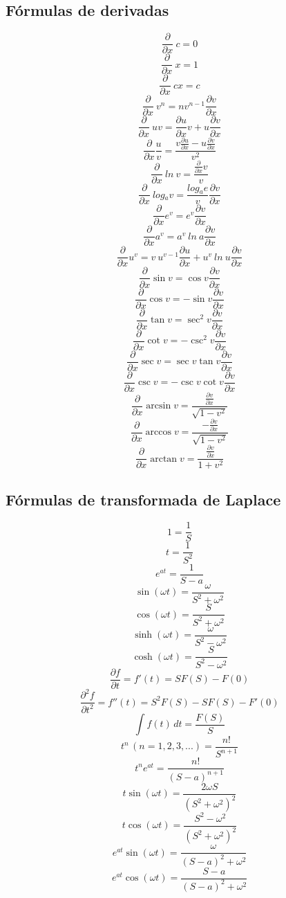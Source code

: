 \documentclass[landscape,twocolumn,letter]{book}
\begin{document}
		\subsection{Fórmulas de derivadas}
		\[ \frac{\partial}{\partial x}\ c = 0 \]
		\[ \frac{\partial}{\partial x}\ x = 1 \]
		\[ \frac{\partial}{\partial x}\ cx = c \]
		\[ \frac{\partial}{\partial x}\ v^n = nv^{n-1} \frac{\partial v}{\partial x} \]
		\[ \frac{\partial}{\partial x}\ uv = \frac{\partial u}{\partial x}v + u\frac{\partial v}{\partial x} \]	
		\[ \frac{\partial}{\partial x} \frac{u}{v} = \frac{v\frac{\partial u}{\partial x}-u\frac{\partial v}{\partial x}}{v^2} \]
		\[ \frac{\partial}{\partial x}\ ln{\ v} = \frac{\frac{\partial}{\partial x}v}{v} \]
		\[ \frac{\partial}{\partial x}\ log{_{a}v} = \frac{log{_{a}e}}{v}\frac{\partial v}{\partial x} \]
		\[ \frac{\partial}{\partial x} e^v = e^v\frac{\partial v}{\partial x} \]
		\[ \frac{\partial}{\partial x} a^v = a^v\ ln{\ a}\frac{\partial v}{\partial x} \]
		\[ \frac{\partial}{\partial x} u^v = v\ u^{v-1}\frac{\partial u}{\partial x} + u^v\ ln{\ u}\frac{\partial v}{\partial x} \]
		\[ \frac{\partial}{\partial x} \sin{v} = \cos{v}\frac{\partial v}{\partial x} \]
		\[ \frac{\partial}{\partial x} \cos{v} = -\sin{v}\frac{\partial v}{\partial x} \]
		\[ \frac{\partial}{\partial x} \tan{v} = \sec^2{v}\frac{\partial v}{\partial x} \]
		\[ \frac{\partial}{\partial x} \cot{v} = -\csc^2{v}\frac{\partial v}{\partial x} \]
		\[ \frac{\partial}{\partial x} \sec{v} = \sec{v}\tan{v}\frac{\partial v}{\partial x} \]
		\[ \frac{\partial}{\partial x} \csc{v} = -\csc{v}\cot{v}\frac{\partial v}{\partial x} \]
		\[ \frac{\partial}{\partial x} \arcsin{v} = \frac{\frac{\partial v}{\partial x}}{\sqrt{1-v^2}} \]
		\[ \frac{\partial}{\partial x} \arccos{v} = \frac{-\frac{\partial v}{\partial x}}{\sqrt{1-v^2}} \]
		\[ \frac{\partial}{\partial x} \arctan{v} = \frac{\frac{\partial v}{\partial x}}{1+v^2} \]
		
		\subsection{Fórmulas de transformada de Laplace}
		\[ 1 = \frac{1}{S} \]
		\[ t = \frac{1}{S^2} \]
		\[ e^{at} = \frac{1}{S-a} \]
		\[ \sin(\omega t) = \frac{\omega}{S^2+\omega^2} \]
		\[ \cos(\omega t) = \frac{S}{S^2+\omega^2} \]
		\[ \sinh(\omega t) = \frac{\omega}{S^2-\omega^2} \]
		\[ \cosh(\omega t) = \frac{S}{S^2-\omega^2} \]
		\[ \frac{\partial f}{\partial t} = f'{(t)} = SF(S)-F(0) \]
		\[ \frac{\partial^2 f}{\partial t^2} = f''{(t)} = S^2F(S)-SF(S) - F'(0) \]
		\[ \int f(t) \,dt = \frac{F(S)}{S} \]
		\[ t^n \,(n=1,2,3, ...) = \frac{n!}{S^{n+1}} \]
		\[ t^n e^{at} = \frac{n!}{{(S-a)}^{n+1}} \]
		\[ t \sin(\omega t) = \frac{2 \omega S}{{(S^2+\omega^2)}^2} \]
		\[ t \cos(\omega t) = \frac{S^2-\omega^2}{{(S^2+\omega^2)}^2} \]
		\[ e^{at} \sin(\omega t) = \frac{\omega}{{(S-a)}^2+\omega^2} \]
		\[ e^{at} \cos(\omega t) = \frac{S-a}{{(S-a)}^2+\omega^2} \]
\end{document}
